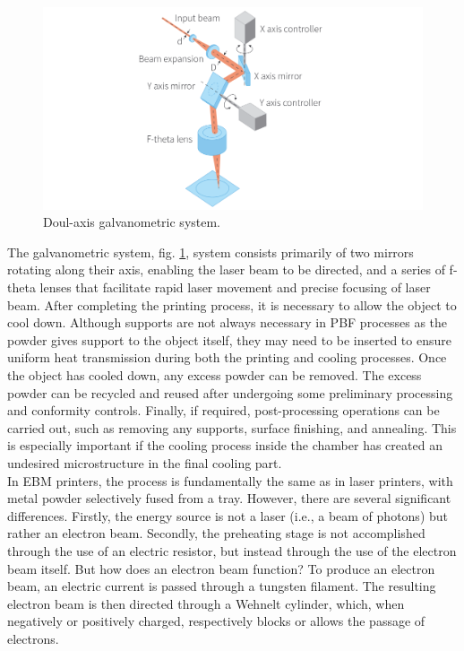 \begin{figure}[H]
    \centering
    \includegraphics[scale=0.5]{Images/galvanometro.png}
    \caption[Galvanometric system.]{Doul-axis galvanometric system.}
    \label{fig:galvano}
\end{figure}
The galvanometric system, fig. \ref{fig:galvano}, system consists primarily of two mirrors rotating along their axis, enabling the laser beam to be directed, and a series of f-theta lenses that facilitate rapid laser movement and precise focusing of laser beam. After completing the printing process, it is necessary to allow the object to cool down. Although supports are not always necessary in PBF processes as the powder gives support to the object itself, they may need to be inserted to ensure uniform heat transmission during both the printing and cooling processes. Once the object has cooled down, any excess powder can be removed. The excess powder can be recycled and reused after undergoing some preliminary processing and conformity controls. Finally, if required, post-processing operations can be carried out, such as removing any supports, surface finishing, and annealing. This is especially important if the cooling process inside the chamber has created an undesired microstructure in the final cooling part.\\
In EBM printers, the process is fundamentally the same as in laser printers, with metal powder selectively fused from a tray. However, there are several significant differences. Firstly, the energy source is not a laser (i.e., a beam of photons) but rather an electron beam. Secondly, the preheating stage is not accomplished through the use of an electric resistor, but instead through the use of the electron beam itself. But how does an electron beam function? To produce an electron beam, an electric current is passed through a tungsten filament. The resulting electron beam is then directed through a Wehnelt cylinder, which, when negatively or positively charged, respectively blocks or allows the passage of electrons.

